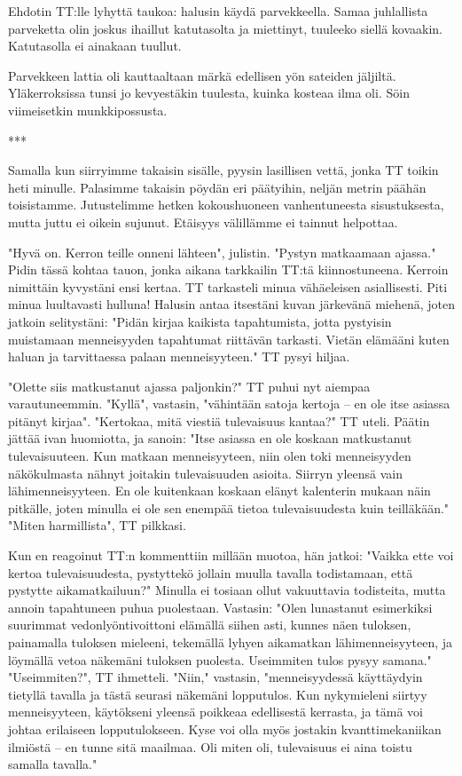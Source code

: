 ﻿\documentclass[a4paper, 12pt, finnish]{article}
\begin{document}
Ehdotin TT:lle lyhyttä taukoa: halusin käydä parvekkeella. Samaa
juhlallista parveketta olin joskus ihaillut katutasolta
ja miettinyt, tuuleeko siellä kovaakin. Katutasolla ei ainakaan tuullut.

Parvekkeen lattia oli kauttaaltaan märkä edellisen yön sateiden
jäljiltä. Yläkerroksissa tunsi jo kevyestäkin tuulesta, kuinka
kosteaa ilma oli. Söin viimeisetkin munkkipossusta.

***

Samalla kun siirryimme takaisin sisälle, pyysin lasillisen vettä,
jonka TT toikin heti minulle. Palasimme takaisin pöydän eri
päätyihin, neljän metrin päähän toisistamme.
Jutustelimme hetken kokoushuoneen vanhentuneesta sisustuksesta,
mutta juttu ei oikein sujunut. Etäisyys välillämme ei tainnut helpottaa.

"Hyvä on. Kerron teille onneni lähteen", julistin.
"Pystyn matkaamaan ajassa." Pidin tässä kohtaa
tauon, jonka aikana tarkkailin TT:tä kiinnostuneena.
Kerroin nimittäin kyvystäni ensi kertaa. TT tarkasteli
minua vähäeleisen asiallisesti. Piti minua luultavasti hulluna!
Halusin antaa itsestäni kuvan järkevänä miehenä, joten
jatkoin selitystäni: "Pidän kirjaa kaikista tapahtumista,
jotta pystyisin muistamaan menneisyyden tapahtumat riittävän
tarkasti. Vietän elämääni kuten haluan ja tarvittaessa
palaan menneisyyteen." TT pysyi hiljaa.

"Olette siis matkustanut ajassa paljonkin?" TT puhui nyt
aiempaa varautuneemmin.
"Kyllä", vastasin, "vähintään satoja kertoja -- en ole
itse asiassa pitänyt kirjaa".
"Kertokaa, mitä viestiä tulevaisuus kantaa?" TT uteli.
Päätin jättää ivan huomiotta, ja sanoin:
"Itse asiassa en ole koskaan matkustanut
tulevaisuuteen. Kun matkaan menneisyyteen, niin
olen toki menneisyyden näkökulmasta nähnyt joitakin
tulevaisuuden asioita. Siirryn yleensä vain
lähimenneisyyteen. En ole kuitenkaan koskaan elänyt
kalenterin mukaan näin pitkälle, joten minulla
ei ole sen enempää tietoa tulevaisuudesta kuin teilläkään."
"Miten harmillista", TT pilkkasi.

Kun en reagoinut TT:n kommenttiin millään muotoa, hän jatkoi:
"Vaikka ette voi kertoa tulevaisuudesta, pystyttekö jollain muulla
tavalla todistamaan, että pystytte aikamatkailuun?"
Minulla ei tosiaan ollut vakuuttavia todisteita, mutta annoin tapahtuneen
puhua puolestaan. Vastasin: "Olen lunastanut esimerkiksi
suurimmat vedonlyöntivoittoni elämällä siihen asti,
kunnes näen tuloksen, painamalla tuloksen mieleeni,
tekemällä lyhyen aikamatkan lähimenneisyyteen,
ja löymällä vetoa näkemäni tuloksen puolesta. Useimmiten tulos pysyy samana."
"Useimmiten?", TT ihmetteli.
"Niin," vastasin, "menneisyydessä käyttäydyin tietyllä tavalla
ja tästä seurasi näkemäni lopputulos. Kun nykymieleni siirtyy
menneisyyteen, käytökseni yleensä poikkeaa edellisestä kerrasta,
ja tämä voi johtaa erilaiseen lopputulokseen. Kyse voi olla myös
jostakin kvanttimekaniikan ilmiöstä -- en tunne sitä maailmaa.
Oli miten oli, tulevaisuus ei aina toistu samalla tavalla."
\end{document}
